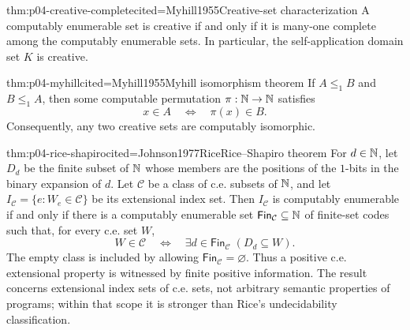 \begin{hbtheorem}{thm:p04-creative-complete}{cited=Myhill1955}{Creative-set characterization}
A computably enumerable set is creative if and only if it is
many-one complete among the computably enumerable sets.  In particular, the
self-application domain set \(K\) is creative.
\end{hbtheorem}

\begin{hbtheorem}{thm:p04-myhill}{cited=Myhill1955}{Myhill isomorphism theorem}
If \(A\leq_1B\) and \(B\leq_1A\), then some computable permutation
\(\pi:\mathbb{N}\to\mathbb{N}\) satisfies
\[
 x\in A\quad\Leftrightarrow\quad\pi(x)\in B.
\]
Consequently, any two creative sets are computably isomorphic.
\end{hbtheorem}

\begin{hbtheorem}{thm:p04-rice-shapiro}{cited=Johnson1977Rice}{Rice--Shapiro theorem}
For \(d\in\mathbb{N}\), let \(D_d\) be the finite subset of \(\mathbb{N}\) whose members are
the positions of the \(1\)-bits in the binary expansion of \(d\).  Let
\(\mathcal C\) be a class of c.e. subsets of \(\mathbb{N}\), and let
\(I_{\mathcal C}=\{e:W_e\in\mathcal C\}\) be its extensional index set.
Then \(I_{\mathcal C}\) is computably enumerable if and only if there is a
computably enumerable set \(\mathsf{Fin}_{\mathcal C}\subseteq\mathbb{N}\) of
finite-set codes such
that, for every c.e. set \(W\),
\[
 W\in\mathcal C
 \quad\Leftrightarrow\quad
 \exists d\in\mathsf{Fin}_{\mathcal C}\;(D_d\subseteq W).
\]
The empty class is included by allowing
\(\mathsf{Fin}_{\mathcal C}=\varnothing\).
Thus a positive c.e. extensional property is witnessed by finite positive
information.  The result concerns extensional index sets of c.e. sets, not
arbitrary semantic properties of programs; within that scope it is stronger
than Rice's undecidability classification.
\end{hbtheorem}

